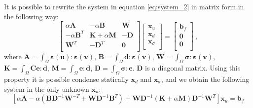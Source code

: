 \documentclass[a4paper,11pt]{article}
\begin{document}
It is possible to rewrite the system in equation \eqref{eq:system_2} in matrix form in the following way: 
\begin{equation}
\left[
\begin{array}{ccc}
\alpha \bm{A} & -\alpha \bm{B} & \bm{W} \\
-\alpha \bm{B}^{T} & \bm{K}+\alpha \bm{M} & -\bm{D} \\
\bm{W}^{T}  & - \bm{D}^{T} & \bm{0} \\ 
\end{array}
\right] 
\left[
\begin{array}{c}
\bm{x}_{u} \\
\bm{x}_{d} \\
\bm{x}_{\sigma} \\
\end{array}
\right] =
\left[
\begin{array}{c}
\bm{b}_{f} \\
\bm{0} \\
\bm{0} \\
\end{array}
\right]\:,
\end{equation}
where 
$\bm{A}=\int_{\Omega}\bm{\varepsilon}(\bm{u}):\bm{\varepsilon}(\bm{v})$, 
$\bm{B}=\int_{\Omega}\bm{d}:\bm{\varepsilon}(\bm{v})$, 
$\bm{W}=\int_{\Omega}\bm{\sigma}:\bm{\varepsilon}(\bm{v})$, 
$\bm{K}=\int_{\Omega}\bm{C}\bm{e}:\bm{d}$, 
$\bm{M}=\int_{\Omega}\bm{e}:\bm{d}$, 
$\bm{D}=\int_{\Omega}\bm{\sigma}:\bm{e}$.  
$\bm{D}$ is a diagonal matrix.
Using this property it is possible condense statically $\bm{x}_{d}$ and $\bm{x}_{\sigma}$, and we obtain the following system in the only unknown 
$\bm{x}_{u}$:
\begin{equation}
\left[ \alpha \bm{A} - \alpha \left( \bm{B} \bm{D}^{-1} \bm{W}^{-T} 
+ \bm{W} \bm{D}^{-1} \bm{B}^{T} \right) + 
\bm{W} \bm{D}^{-1} \left( \bm{K} + \alpha \bm{M} \right) 
\bm{D}^{-1} \bm{W}^{T} \right] \bm{x}_{u} = \bm{b}_{f}
\end{equation}
\end{document}

